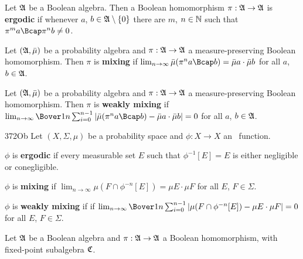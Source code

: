  Let $\frak A$ be a Boolean algebra.
Then a Boolean homomorphism $\pi:\frak A\to\frak A$ is {\bf ergodic} if
whenever $a$, $b\in\frak A\setminus\{0\}$ there are $m$, $n\in\Bbb N$ such
that $\pi^ma\Bcap\pi^nb\ne 0$.

\medskip

 Let $(\frak A,\bar\mu)$ be a probability
algebra and $\pi:\frak A\to\frak A$ a measure-preserving Boolean
homomorphism.   Then $\pi$ is {\bf mixing}
if $\lim_{n\to\infty}\bar\mu(\pi^na\Bcap b)=\bar\mu a\cdot\bar\mu b$ for
all $a$, $b\in\frak A$.

\medskip

 Let $(\frak A,\bar\mu)$ be a probability
algebra and $\pi:\frak A\to\frak A$ a measure-preserving Boolean
homomorphism.   Then $\pi$ is {\bf weakly mixing}
if $\lim_{n\to\infty}\Bover1n\sum_{i=0}^{n-1}
|\bar\mu(\pi^na\Bcap b)-\bar\mu a\cdot\bar\mu b|=0$ for
all $a$, $b\in\frak A$.

\medskip

\spheader 372Ob Let $(X,\Sigma,\mu)$ be a probability space and
$\phi:X\to X$ an \imp\ function.

\medskip

 $\phi$ is {\bf ergodic} if every measurable set $E$ such
that $\phi^{-1}[E]=E$ is either negligible or conegligible.

\medskip

 $\phi$ is {\bf mixing} if
$\lim_{n\to\infty}\mu(F\cap\phi^{-n}[E])=\mu E\cdot\mu F$ for all $E$,
$F\in\Sigma$.

\medskip

 $\phi$ is {\bf weakly mixing} if
if $\lim_{n\to\infty}\Bover1n\sum_{i=0}^{n-1}
|\mu(F\cap\phi^{-n}[E])-\mu E\cdot\mu F|=0$ for
all $E$, $F\in\Sigma$.


 Let $\frak A$ be a Boolean algebra and
$\pi:\frak A\to\frak A$ a Boolean homomorphism, with fixed-point subalgebra
$\frak C$.

